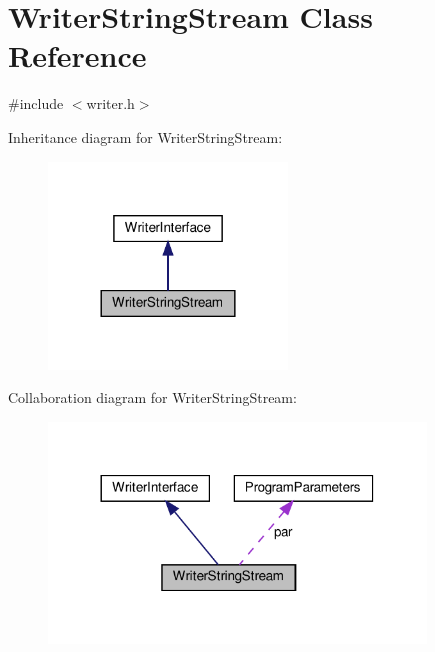 \hypertarget{classWriterStringStream}{}\section{Writer\+String\+Stream Class Reference}
\label{classWriterStringStream}


{\ttfamily \#include $<$writer.\+h$>$}



Inheritance diagram for Writer\+String\+Stream\+:
\nopagebreak
\begin{figure}[H]
\begin{center}
\leavevmode
\includegraphics[width=180pt]{classWriterStringStream__inherit__graph}
\end{center}
\end{figure}


Collaboration diagram for Writer\+String\+Stream\+:
\nopagebreak
\begin{figure}[H]
\begin{center}
\leavevmode
\includegraphics[width=284pt]{classWriterStringStream__coll__graph}
\end{center}
\end{figure}
